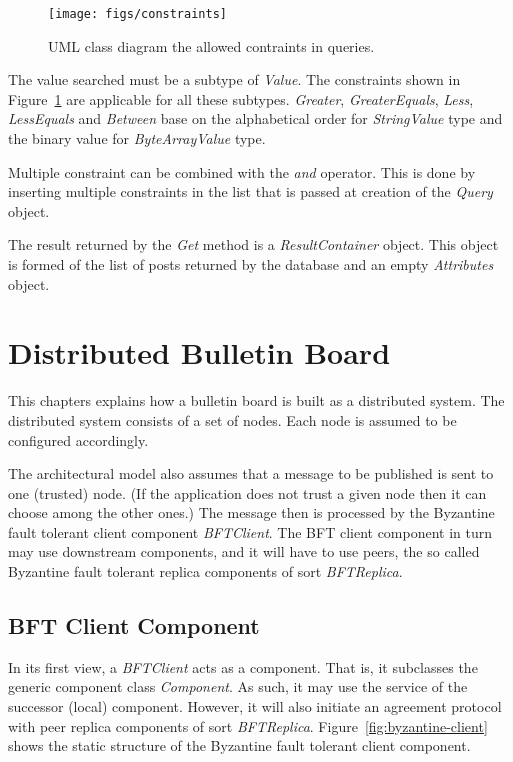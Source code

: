 \documentclass[oneside]{scrreprt}
\newcommand{\fig}[1]{Figure~\ref{#1}}
\begin{document}
\begin{figure}[ht]
\centerline{
\texttt{[image: figs/constraints]}}
\caption{UML class diagram the allowed contraints in queries.}
\label{fig:constraints}
\end{figure}

The value searched must be a subtype of \emph{Value}. The constraints shown in \fig{fig:constraints} are applicable for all these subtypes. \emph{Greater}, \emph{GreaterEquals}, \emph{Less}, \emph{LessEquals} and \emph{Between} base on the alphabetical order for \emph{StringValue} type and the binary value for \emph{ByteArrayValue} type.

Multiple constraint can be combined with the \emph{and} operator. This is done by inserting multiple constraints in the list that is passed at creation of the \emph{Query} object.

The result returned by the \emph{Get} method is a \emph{ResultContainer} object. This object is formed of the list of posts returned by the database and an empty \emph{Attributes} object.
 

\chapter{Distributed Bulletin Board}

This chapters explains how a bulletin board is built as
a distributed system. The distributed system consists of
a set of nodes. Each node is assumed to be configured
accordingly.

The architectural model also assumes that a message to
be published is sent to one (trusted) node. (If the
application does not trust a given node then it can
choose among the other ones.) The message then is
processed by the Byzantine fault tolerant client
component \emph{BFTClient}. The BFT client component in turn
may use downstream components, and it will have
to use peers, the so called Byzantine fault tolerant
replica components of sort \emph{BFTReplica}.


\section{BFT Client Component}

In its first view, a \emph{BFTClient} acts as a component.
That is, it subclasses the generic component class
\emph{Component}. As such, it may use the service of
the successor (local) component. However, it will also
initiate an agreement protocol with peer replica
components of sort \emph{BFTReplica}. \fig{fig:byzantine-client}
shows the static structure of the Byzantine fault tolerant client
component.
\end{document}
